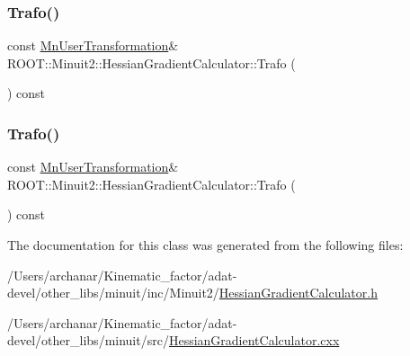 \mbox{\label{classROOT_1_1Minuit2_1_1HessianGradientCalculator_a4b122eecb0217cab813601572ccbac74}} 
\subsubsection{\texorpdfstring{Trafo()}{Trafo()}\hspace{0.1cm}{\footnotesize\ttfamily [2/3]}}
{\footnotesize\ttfamily const \mbox{\hyperlink{classROOT_1_1Minuit2_1_1MnUserTransformation}{Mn\+User\+Transformation}}\& R\+O\+O\+T\+::\+Minuit2\+::\+Hessian\+Gradient\+Calculator\+::\+Trafo (\begin{DoxyParamCaption}{ }\end{DoxyParamCaption}) const\hspace{0.3cm}{\ttfamily [inline]}}

\mbox{\label{classROOT_1_1Minuit2_1_1HessianGradientCalculator_a4b122eecb0217cab813601572ccbac74}} 
\subsubsection{\texorpdfstring{Trafo()}{Trafo()}\hspace{0.1cm}{\footnotesize\ttfamily [3/3]}}
{\footnotesize\ttfamily const \mbox{\hyperlink{classROOT_1_1Minuit2_1_1MnUserTransformation}{Mn\+User\+Transformation}}\& R\+O\+O\+T\+::\+Minuit2\+::\+Hessian\+Gradient\+Calculator\+::\+Trafo (\begin{DoxyParamCaption}{ }\end{DoxyParamCaption}) const\hspace{0.3cm}{\ttfamily [inline]}}



The documentation for this class was generated from the following files\+:\begin{DoxyCompactItemize}
\item 
/\+Users/archanar/\+Kinematic\+\_\+factor/adat-\/devel/other\+\_\+libs/minuit/inc/\+Minuit2/\mbox{\hyperlink{adat-devel_2other__libs_2minuit_2inc_2Minuit2_2HessianGradientCalculator_8h}{Hessian\+Gradient\+Calculator.\+h}}\item 
/\+Users/archanar/\+Kinematic\+\_\+factor/adat-\/devel/other\+\_\+libs/minuit/src/\mbox{\hyperlink{adat-devel_2other__libs_2minuit_2src_2HessianGradientCalculator_8cxx}{Hessian\+Gradient\+Calculator.\+cxx}}\end{DoxyCompactItemize}
